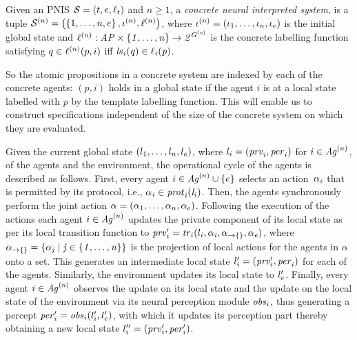 \begin{definition}
  \label{def:concreteystem}
Given an PNIS $\mathcal S = \left ( {t}, {e}, \ell_t \right )$ and $n \geq 1$, a
\emph{concrete neural interpreted system}, is a tuple $\mathcal{S}^{(n)} = \left (  \left \{ {1},
\ldots, {n}, {e} \right \}, \iota^{({n})}, \ell^{(n)} \right )$, where $\iota^{({n})} =
\left ( \iota_{1}, \ldots, \iota_{n}, \iota_{e} \right )$ is the initial global state and
$\ell^{(n)} :  \it{AP} \times \left \{ 1, \ldots, n  \right \} \rightarrow 2^{G^{(n)}}$ is the concrete labelling function satisfying $q \in \ell^{(n)}(p,i)$ iff
$\it{ls}_{i}(q) \in \ell_{i}(p)$.
\end{definition}


So the atomic propositions in a concrete system are indexed by each of the
concrete agents: $(p, i)$ holds in a global state if the agent $i$ is at a local
state labelled with $p$ by the template labelling function. This will enable us
to construct specifications independent of the size of the concrete system on
which they are evaluated.


Given the current global state $\left ( l_{1}, \ldots, l_{n}, l_{e} \right )$, where $l_{i} = \left ( \mathit{prv}_{i}, \mathit{per}_{i} \right )$ for $i \in \mathit{Ag}^{(n)}$, of the
agents and the environment, the operational cycle of the agents is described as
follows. First, every agent ${i} \in \mathit{Ag}^{(n)} \cup \left \{ {e} \right \}$ selects an
action~$\it{\alpha}_{i}$ that is permitted by its protocol, i.e., $\it{\alpha}_{i} \in \mathit{prot}_{i}
(l_{i})$. Then, the agents synchronously perform the joint action $\alpha =
\left ( \alpha_1,\ldots,\alpha_n,\alpha_e \right )$.  Following  the execution of the
actions each agent ${i} \in \mathit{Ag}^{(n)}$ updates the private component of its
local state as per its local transition function to $\mathit{prv}'_{i} = \mathit{tr}_{i}(
l_{i}, \it{\alpha}_{i}, \alpha_{\rightarrow\{\}}, \it{\alpha}_{e})$, where
$\alpha_{\rightarrow\{\}} = \left \{  \it{\alpha}_{j} \mid j \in \left \{ 1, \ldots, n \right \} \right \}$ is the
projection of local actions for the agents in $\alpha$ onto a set.  This
generates an intermediate local state $l'_{i} = \left ( \mathit{prv}'_{i}, \mathit{per}_{i} \right )$
for each of the agents. Similarly, the environment updates its local state to
$l'_{e}$. Finally, every agent ${i} \in \mathit{Ag}^{(n)}$ observes the update on
its local state and the update on the local state of the environment via its
neural perception module $\mathit{obs}_{i}$, thus generating a percept $\mathit{per}'_{i} = \mathit{obs}_{i}(l'_{i}, l'_{e})$, with which it updates its perception part thereby
obtaining a new local state $l''_{i} = \left (  \mathit{prv}'_{i}, \mathit{per}'_{i} \right )$.


